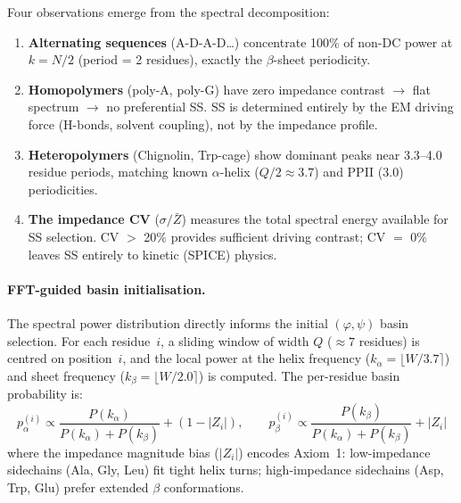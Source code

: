 \noindent Four observations emerge from the spectral decomposition:
\begin{enumerate}
    \item \textbf{Alternating sequences} (A-D-A-D\ldots) concentrate
          100\% of non-DC power at $k = N/2$ (period = 2 residues),
          exactly the $\beta$-sheet periodicity.
    \item \textbf{Homopolymers} (poly-A, poly-G) have zero impedance
          contrast $\to$ flat spectrum $\to$ no preferential SS.
          SS is determined entirely by the EM driving force (H-bonds,
          solvent coupling), not by the impedance profile.
    \item \textbf{Heteropolymers} (Chignolin, Trp-cage) show dominant
          peaks near 3.3--4.0 residue periods, matching known
          $\alpha$-helix ($Q/2 \approx 3.7$) and PPII ($3.0$) periodicities.
    \item \textbf{The impedance CV} ($\sigma/\bar{Z}$) measures the
          total spectral energy available for SS selection.
          CV $>$ 20\% provides sufficient driving contrast;
          CV $=$ 0\% leaves SS entirely to kinetic (SPICE) physics.
\end{enumerate}

\paragraph{FFT-guided basin initialisation.}
The spectral power distribution directly informs the initial
$(\varphi, \psi)$ basin selection.  For each residue~$i$, a sliding
window of width $Q$ ($\approx 7$ residues) is centred on position~$i$,
and the local power at the helix frequency ($k_\alpha = \lfloor W/3.7
\rceil$) and sheet frequency ($k_\beta = \lfloor W/2.0 \rceil$) is
computed.  The per-residue basin probability is:
\begin{equation}
    p_\alpha^{(i)} \propto \frac{P(k_\alpha)}{P(k_\alpha) + P(k_\beta)}
    + (1 - |Z_i|), \qquad
    p_\beta^{(i)} \propto \frac{P(k_\beta)}{P(k_\alpha) + P(k_\beta)}
    + |Z_i|
    \label{eq:fft_basin_init}
\end{equation}
where the impedance magnitude bias ($|Z_i|$) encodes Axiom~1:
low-impedance sidechains (Ala, Gly, Leu) fit tight helix turns;
high-impedance sidechains (Asp, Trp, Glu) prefer extended $\beta$
conformations.

